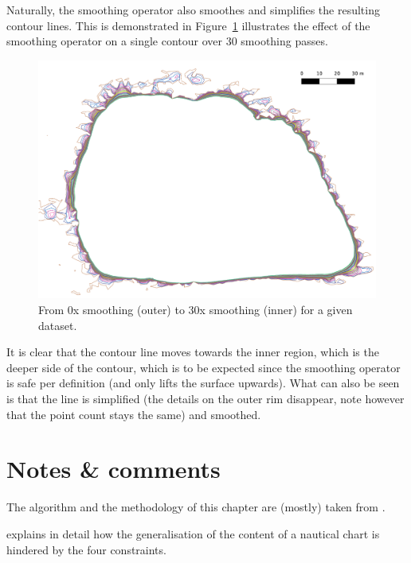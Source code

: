 Naturally, the smoothing operator also smoothes and simplifies the resulting contour lines. 
This is demonstrated in Figure~\ref{fig:zl1845lineview} illustrates the effect of the smoothing operator on a single contour over 30 smoothing passes. 
\begin{figure}
  \centering
  \includegraphics[width=0.95\linewidth]{figs/zl1845detailcontours0-30.pdf}
  \caption{From 0x smoothing (outer) to 30x smoothing (inner) for a given dataset.}
\label{fig:zl1845lineview}
\end{figure}
It is clear that the contour line moves towards the inner region, which is the deeper side of the contour, which is to be expected since the smoothing operator is safe per definition (and only lifts the surface upwards). 
What can also be seen is that the line is simplified (the details on the outer rim disappear, note however that the point count stays the same) and smoothed. 


%
\section{Notes \& comments}

The algorithm and the methodology of this chapter are (mostly) taken from \citet{Peters14}.

\citet{Zhang11} explains in detail how the generalisation of the content of a nautical chart is hindered by the four constraints.

